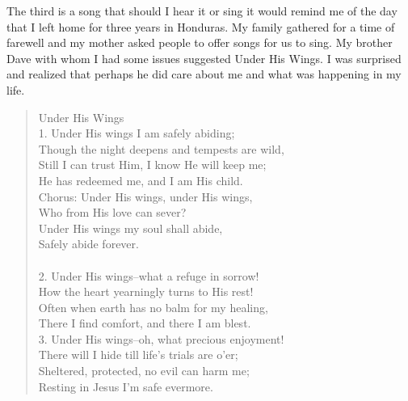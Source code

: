 The third is a song that should I hear it or sing it would remind me of the day that I left home for three years in Honduras. My family gathered for a time of farewell and my mother asked people to offer songs for us to sing. My brother Dave with whom I had some issues suggested Under His Wings. I was surprised and realized that perhaps he did care about me and what was happening in my life. 
\begin{quotation}
Under His Wings \\
1. Under His wings I am safely abiding; \\
    Though the night deepens and tempests are wild, \\
Still I can trust Him, I know He will keep me; \\
    He has redeemed me, and I am His child. \\
Chorus: Under His wings, under His wings,\\
    Who from His love can sever? \\
Under His wings my soul shall abide, \\
    Safely abide forever.  \\\\
2. Under His wings--what a refuge in sorrow!\\
    How the heart yearningly turns to His rest!\\
Often when earth has no balm for my healing,\\
    There I find comfort, and there I am blest. \\
3. Under His wings--oh, what precious enjoyment!\\
    There will I hide till life's trials are o'er;\\
Sheltered, protected, no evil can harm me;\\
    Resting in Jesus I'm safe evermore.
\end{quotation}
